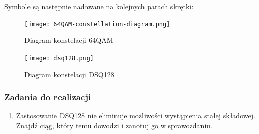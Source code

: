 Symbole są następnie nadawane na kolejnych parach skrętki:
\begin{table}[h]
    \centering
\end{table}

\begin{figure}[h]
    \centering
    \texttt{[image: 64QAM-constellation-diagram.png]}
    \caption{Diagram konstelacji 64QAM}
    \label{fig:lab-64QAM}
\end{figure}

\begin{figure}[h]
    \centering
    \texttt{[image: dsq128.png]}
    \caption{Diagram konstelacji DSQ128}
    \label{fig:lab-dsq128}
\end{figure}

\clearpage

\subsubsection{Zadania do realizacji}

\begin{enumerate}
    \item Zastosowanie DSQ128 nie eliminuje możliwości wystąpienia stałej składowej. Znajdź ciąg, który
    temu dowodzi i zanotuj go w sprawozdaniu.
\end{enumerate}
